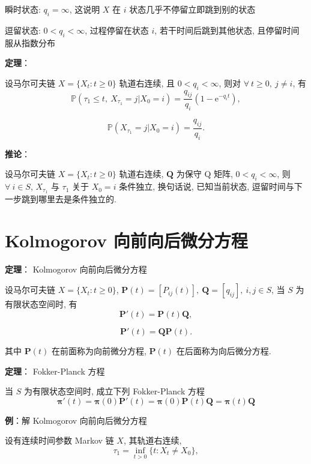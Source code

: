 \documentclass[openany]{ctexbook}
\theoremstyle{kaiti}
\theoremstyle{normal}
\begin{document}
瞬时状态: $q_i=\infty$, 这说明 $X$ 在 $i$ 状态几乎不停留立即跳到别的状态

逗留状态: $0 < q_i < \infty$, 过程停留在状态 $i$, 若干时间后跳到其他状态, 且停留时间服从指数分布

\textbf{定理}：

设马尔可夫链 $X=\{X_t:t\geqslant0\}$ 轨道右连续, 且 $0 < q_i < \infty$, 则对 $\forall~t\geqslant0,~j\neq i$, 有
\begin{equation}
  \mathbb{P}(\tau_1\leqslant t,~X_{\tau_1}=j|X_0=i)=\frac{q_{ij}}{q_i}(1-\mathrm{e}^{-q_it}),
\end{equation}

\begin{equation}
  \mathbb{P}(X_{\tau_1}=j|X_0=i)=\frac{q_{ij}}{q_i}.
\end{equation}

\textbf{推论}：

设马尔可夫链 $X=\{X_t:t\geqslant0\}$ 轨道右连续, $\bm{Q}$ 为保守 Q 矩阵, $0 < q_i < \infty$, 则 $\forall~i\in S$, $X_{\tau_1}$ 与 $\tau_1$ 关于 $X_0=i$ 条件独立, 换句话说, 已知当前状态, 逗留时间与下一步跳到哪里去是条件独立的.

\section{Kolmogorov 向前向后微分方程}

\textbf{定理}： Kolmogorov 向前向后微分方程

设马尔可夫链 $X=\{X_t:t\geqslant0\}$, $\bm{P}(t)=[P_{ij}(t)],~\bm{Q}=[q_{ij}],~i,j\in S$, 当 $S$ 为有限状态空间时, 有
\begin{equation}
  \bm{P}'(t)=\bm{P}(t)\bm{Q},
\end{equation}

\begin{equation}
  \bm{P}'(t)=\bm{Q}\bm{P}(t).
\end{equation}

其中 $\bm{P}(t)$ 在前面称为向前微分方程, $\bm{P}(t)$ 在后面称为向后微分方程.

\textbf{定理}： Fokker-Planck 方程

当 $S$ 为有限状态空间时, 成立下列 Fokker-Planck 方程
\begin{equation}
  \bm{\pi}'(t)=\bm{\pi}(0)\bm{P}'(t)=\bm{\pi}(0)\bm{P}(t)\bm{Q}=\bm{\pi}(t)\bm{Q}
\end{equation}

\textbf{例}：解 Kolmogorov 向前向后微分方程

设有连续时间参数 Markov 链 $X$, 其轨道右连续, 
\begin{equation}
  \tau_1=\inf_{t>0}\{t:X_t\neq X_0\},
\end{equation}
\end{document}
